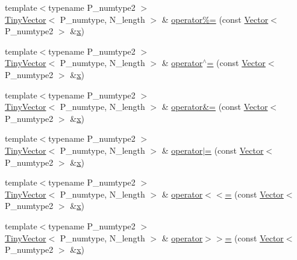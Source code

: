 \begin{DoxyCompactItemize}
\item 
{\footnotesize template$<$typename P\+\_\+numtype2 $>$ }\\\hyperlink{classTinyVector}{Tiny\+Vector}$<$ P\+\_\+numtype, N\+\_\+length $>$ \& \hyperlink{classTinyVector_abfc952a93ab11117ba25c6bd2f0a58a6}{operator\%=} (const \hyperlink{classVector}{Vector}$<$ P\+\_\+numtype2 $>$ \&\hyperlink{vecnorm1_8cc_ac73eed9e41ec09d58f112f06c2d6cb63}{x})
\item 
{\footnotesize template$<$typename P\+\_\+numtype2 $>$ }\\\hyperlink{classTinyVector}{Tiny\+Vector}$<$ P\+\_\+numtype, N\+\_\+length $>$ \& \hyperlink{classTinyVector_aa1d847b71a06942a232bcca0fd135cea}{operator$^\wedge$=} (const \hyperlink{classVector}{Vector}$<$ P\+\_\+numtype2 $>$ \&\hyperlink{vecnorm1_8cc_ac73eed9e41ec09d58f112f06c2d6cb63}{x})
\item 
{\footnotesize template$<$typename P\+\_\+numtype2 $>$ }\\\hyperlink{classTinyVector}{Tiny\+Vector}$<$ P\+\_\+numtype, N\+\_\+length $>$ \& \hyperlink{classTinyVector_a479d2c4844762f180ba320d67aa1769b}{operator\&=} (const \hyperlink{classVector}{Vector}$<$ P\+\_\+numtype2 $>$ \&\hyperlink{vecnorm1_8cc_ac73eed9e41ec09d58f112f06c2d6cb63}{x})
\item 
{\footnotesize template$<$typename P\+\_\+numtype2 $>$ }\\\hyperlink{classTinyVector}{Tiny\+Vector}$<$ P\+\_\+numtype, N\+\_\+length $>$ \& \hyperlink{classTinyVector_a35c9f74a5c730a8ba57db35b6f435123}{operator$\vert$=} (const \hyperlink{classVector}{Vector}$<$ P\+\_\+numtype2 $>$ \&\hyperlink{vecnorm1_8cc_ac73eed9e41ec09d58f112f06c2d6cb63}{x})
\item 
{\footnotesize template$<$typename P\+\_\+numtype2 $>$ }\\\hyperlink{classTinyVector}{Tiny\+Vector}$<$ P\+\_\+numtype, N\+\_\+length $>$ \& \hyperlink{classTinyVector_a289273505e9e7b48a384663d27ba412b}{operator$<$$<$=} (const \hyperlink{classVector}{Vector}$<$ P\+\_\+numtype2 $>$ \&\hyperlink{vecnorm1_8cc_ac73eed9e41ec09d58f112f06c2d6cb63}{x})
\item 
{\footnotesize template$<$typename P\+\_\+numtype2 $>$ }\\\hyperlink{classTinyVector}{Tiny\+Vector}$<$ P\+\_\+numtype, N\+\_\+length $>$ \& \hyperlink{classTinyVector_ad35351afa1b4b6d194f6d99937094d95}{operator$>$$>$=} (const \hyperlink{classVector}{Vector}$<$ P\+\_\+numtype2 $>$ \&\hyperlink{vecnorm1_8cc_ac73eed9e41ec09d58f112f06c2d6cb63}{x})
\item 

\end{DoxyCompactItemize}
